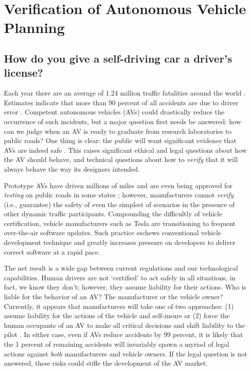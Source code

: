  \section{Verification of Autonomous Vehicle Planning}
 
 \subsection{How do you give a self-driving car a driver's license?}
 Each year there are an average of 1.24 million traffic fatalities around the world \cite{Waldrop2015}. Estimates indicate that more than 90 percent of all accidents are due to driver error \cite{Waldrop2015}. Competent autonomous vehicles (AVs) could drastically reduce the occurrence of such incidents, but a major question first needs be answered:
 how can we judge when an AV is ready to graduate from research laboratories to public roads?
 One thing is clear: the public will want significant evidence that AVs are indeed safe \cite{weld1994first}. 
 This raises significant ethical and legal questions about how the AV should behave, and technical questions about how to \emph{verify} that it will always behave the way its designers intended.
 
 Prototype AVs have driven millions of miles and are even being approved for \emph{testing} on public roads in some states \cite{Iozzio2014}; however, manufacturers cannot \emph{verify} (i.e., guarantee) the safety of even the simplest of scenarios in the presence of other dynamic traffic participants. 
 Compounding the difficultly of vehicle certification, vehicle manufacturers such as Tesla are transitioning to frequent over-the-air software updates. Such practice eschews conventional vehicle development technique and greatly increases pressure on developers to deliver correct software at a rapid pace. 
 
 The net result is a wide gap between current regulations and our technological capabilities. 
 Human drivers are not `certified' to act safely in all situations, in fact, we know they don't; however, they assume liability for their actions.
 Who is liable for the behavior of an AV? The manufacturer or the vehicle owner?
 Currently, it appears that manufacturers will take one of two approaches: (1) assume liability for the actions of the vehicle and self-insure \cite{volvo15Liability} or (2) force the human occupants of an AV to make all critical decisions and shift liability to the pilot \cite{maurer2015autonomes}. In either case, even if AVs reduce accidents by 99 percent, it is likely that the 1 percent of remaining accidents will invariably spawn a myriad of legal actions against \emph{both} manufacturers \cite{russell2015research} and vehicle owners.   
 If the legal question is not answered, these risks could stifle the development of the AV market.
 
